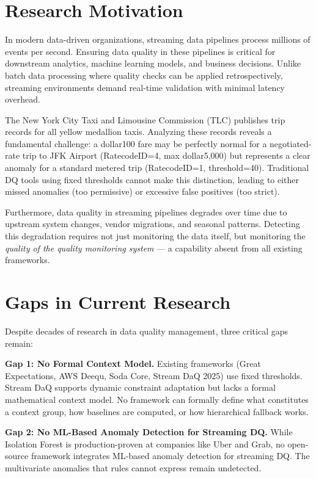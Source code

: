 \documentclass[a4paper, reqno, oneside]{book}
\begin{document}
\section{Research Motivation}
In modern data-driven organizations, streaming data pipelines process millions of events per second. Ensuring data quality in these pipelines is critical for downstream analytics, machine learning models, and business decisions. Unlike batch data processing where quality checks can be applied retrospectively, streaming environments demand real-time validation with minimal latency overhead.

The New York City Taxi and Limousine Commission (TLC) publishes trip records for all yellow medallion taxis. Analyzing these records reveals a fundamental challenge: a dollar100 fare may be perfectly normal for a negotiated-rate trip to JFK Airport (RatecodeID=4, max dollar5,000) but represents a clear anomaly for a standard metered trip (RatecodeID=1, threshold=40). Traditional DQ tools using fixed thresholds cannot make this distinction, leading to either missed anomalies (too permissive) or excessive false positives (too strict).

Furthermore, data quality in streaming pipelines degrades over time due to upstream system changes, vendor migrations, and seasonal patterns. Detecting this degradation requires not just monitoring the data itself, but monitoring the \emph{quality of the quality monitoring system} --- a capability absent from all existing frameworks.

\section{Gaps in Current Research}
Despite decades of research in data quality management, three critical gaps remain:

\textbf{Gap 1: No Formal Context Model.} Existing frameworks (Great Expectations, AWS Deequ, Soda Core, Stream DaQ 2025) use fixed thresholds. Stream DaQ supports dynamic constraint adaptation but lacks a formal mathematical context model. No framework can formally define what constitutes a context group, how baselines are computed, or how hierarchical fallback works.

\textbf{Gap 2: No ML-Based Anomaly Detection for Streaming DQ.} While Isolation Forest is production-proven at companies like Uber and Grab, no open-source framework integrates ML-based anomaly detection for streaming DQ. The multivariate anomalies that rules cannot express remain undetected.
\end{document}
